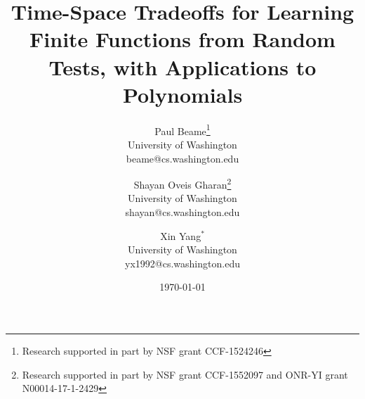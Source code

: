 \documentclass[11pt]{article}
\newcommand{\1}{\mbox{\textbf{1}}}
\begin{document}
\title{Time-Space Tradeoffs for Learning Finite Functions from Random Tests,
with Applications to Polynomials}

\author{Paul Beame\thanks{Research supported in part by NSF grant CCF-1524246} \\ University of Washington \\ beame@cs.washington.edu \and Shayan Oveis Gharan\thanks{Research supported in part by NSF grant CCF-1552097 and ONR-YI grant N00014-17-1-2429}\\ University of Washington \\ shayan@cs.washington.edu \and Xin Yang$^*$ \\University of Washington\\yx1992@cs.washington.edu}

\date{\today}
\maketitle


\thispagestyle{empty}
\newpage
\setcounter{page}{1}






\newpage


\newpage
%
%
\end{document}
